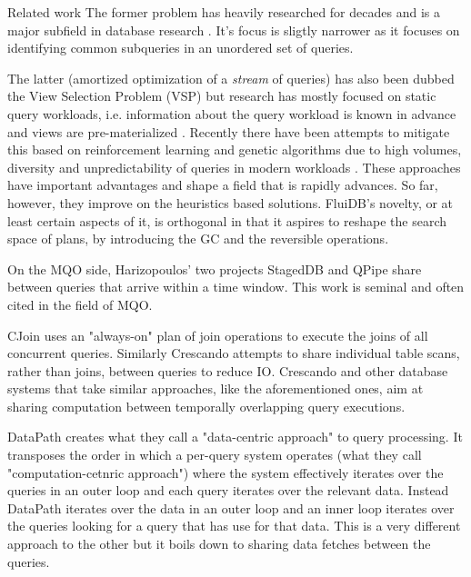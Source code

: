 \begin{corrected}{Related work}
The former problem has heavily researched for decades and is a major
 subfield in database research \cite{sellisMultipleQueryOptimization1987,royEfficientExtensibleAlgorithms2000,ComputingQueriesDerived}. It's
 focus is sligtly narrower as it focuses on identifying common
 subqueries in an unordered set of queries.

The latter (amortized optimization of a \emph{stream} of queries) has also
been dubbed the View Selection Problem (VSP) but research has mostly
focused on static query workloads, i.e. information about the query
workload is known in advance and views are pre-materialized
\cite{phanDynamicMaterializationQuery2008a}. Recently there have been
attempts to mitigate this based on reinforcement learning
\cite{yuanAutomaticViewGeneration2020a} and genetic
algorithms\cite{vijaykumarMaterializedViewSelection2012,zhangGeneticAlgorithmMaterialized1999,bayirGeneticAlgorithmMultipleQuery2007}
due to high volumes, diversity and unpredictability of queries in
modern workloads \cite{liMachineLearningDatabases2021a}. These
approaches have important advantages and shape a field that is rapidly
advances. So far, however, they improve on the heuristics based
solutions. FluiDB's novelty, or at least certain aspects of it, is
orthogonal in that it aspires to reshape the search space of plans, by
introducing the GC and the reversible operations.

On the MQO side, Harizopoulos' two projects StagedDB
\cite{harizopoulosStagedDBDesigningDatabase2005} and QPipe
\cite{harizopoulosQpipeSimultaneouslyPipelined2005} share between
queries that arrive within a time window. This work is seminal and
often cited in the field of MQO.

CJoin \cite{candeaScalablePredictableJoin2009} uses an "always-on" plan
of join operations to execute the joins of all concurrent
queries. Similarly Crescando \cite{giannikisCrescando2010} attempts to
share individual table scans, rather than joins, between queries to
reduce IO. Crescando and other database systems that take similar
approaches, like the aforementioned ones, aim at sharing computation
between temporally overlapping query executions.

DataPath \cite{arumugamDataPathSystemDatacentric2010} creates what they
call a "data-centric approach" to query processing. It transposes the
order in which a per-query system operates (what they call
"computation-cetnric approach") where the system effectively iterates
over the queries in an outer loop and each query iterates over the
relevant data. Instead DataPath iterates over the data in an outer
loop and an inner loop iterates over the queries looking for a query
that has use for that data. This is a very different approach to the
other but it boils down to sharing data fetches between the queries.


\end{corrected}
